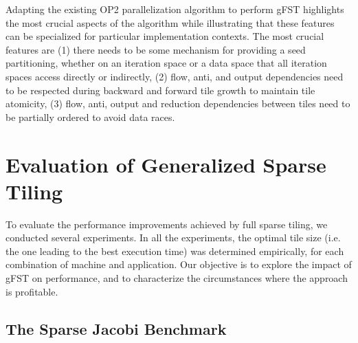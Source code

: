 Adapting the existing OP2 parallelization algorithm to perform gFST highlights the most crucial aspects of the
algorithm while illustrating that these features can be specialized for
particular implementation contexts. The most crucial features are 
(1) there needs to be some mechanism for providing a seed partitioning,
whether on an iteration space or a data space that all iteration spaces access
directly or indirectly, (2) flow, anti, and output dependencies need to be respected 
during backward and forward tile growth to maintain tile atomicity,
(3) flow, anti, output and reduction dependencies between tiles need to be partially ordered
to avoid data races.




\section{Evaluation of Generalized Sparse Tiling}
\label{sec:evaluation}
To evaluate the performance improvements achieved by full sparse tiling, we conducted several experiments. 
In all the experiments, the optimal tile size (i.e. the one leading to the best execution time) was determined empirically, for each combination of machine and application. Our objective is to explore 
the impact of gFST on %
performance, and to characterize the circumstances where the approach is profitable.


\subsection{The Sparse Jacobi Benchmark}
\label{sec:gfst-evaluation}

